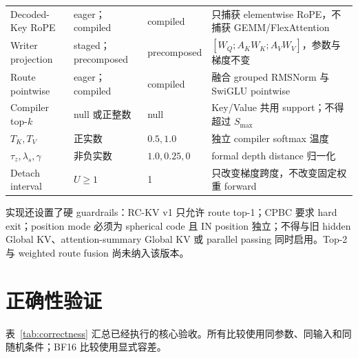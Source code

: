 \documentclass[UTF8,twocolumn,10pt,a4paper]{ctexart}
\newcommand{\RCKV}{\textsf{RC-KV}}
\newcommand{\CPBC}{\textsf{CPBC}}
\begin{document}
\begin{table}[t]
\begin{tabularx}{\textwidth}{p{} p{} p{} Y}
Decoded-Key RoPE & eager；compiled & compiled & 只捕获 elementwise RoPE，不捕获 GEMM/FlexAttention \\
Writer projection & staged；precomposed & precomposed & $[W_Q;A_KW_K;A_VW_V]$，参数与梯度不变 \\
Route pointwise & eager；compiled & compiled & 融合 grouped RMSNorm 与 SwiGLU pointwise \\
Compiler top-$k$ & null 或正整数 & null & Key/Value 共用 support；不得超过 $S_{\max}$ \\
$T_K,T_V$ & 正实数 & $0.5,1.0$ & 独立 compiler softmax 温度 \\
$\tau_z,\lambda_s,\gamma$ & 非负实数 & $1.0,0.25,0$ & formal depth distance 归一化 \\
Detach interval & $U\ge1$ & 1 & 只改变梯度跨度，不改变固定权重 forward \\
\bottomrule
\end{tabularx}
\end{table}

实现还设置了硬 guardrails：\RCKV{} v1 只允许 route top-1；\CPBC{} 要求 hard exit；position mode 必须为 spherical code 且 IN position 独立；不得与旧 hidden Global KV、attention-summary Global KV 或 parallel passing 同时启用。Top-2 与 weighted route fusion 尚未纳入该版本。

\section{正确性验证}
表~\ref{tab:correctness} 汇总已经执行的核心验收。所有比较使用同参数、同输入和同随机条件；BF16 比较使用显式容差。
\end{document}
